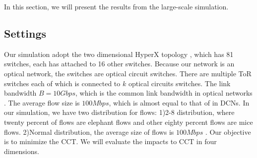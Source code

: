 In this section, we will present the results from the large-scale simulation.
\subsection{Settings}
Our simulation adopt the two dimensional HyperX topology \cite{ahn2009hyperx}, which has 81 switches, each has attached to 16 other switches. Because our network is an optical network, the switches are optical circuit switches. There are multiple ToR switches each of which is connected to $k$ optical circuits switches. The link bandwidth $B=10Gbps$, which is the common link bandwidth in optical networks \cite{chatterjee2015routing} \cite{porter2013integrating}. The average flow size is $100Mbps$, which is almost equal to that of \cite{zhao2015rapier} in DCNs. In our simulation, we have two distribution for flows: 1)2-8 distribution, where twenty percent of flows are elephant flows and other eighty percent flows are mice flows. 2)Normal distribution, the average size of flows is $100Mbps$ \cite{antoniou2002log} \cite{dulman2003trade}. Our objective is to minimize the CCT. We will evaluate the impacts to CCT in four dimensions.

